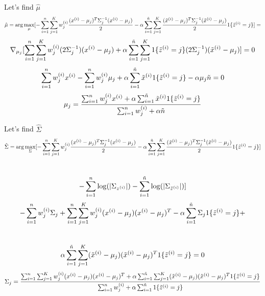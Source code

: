 \begin{answer}
Let's find $\hat{\mu}$
$$\hat{\mu} =  \arg\max_{\mu} [- \sum_{i=1}^{{n}} \sum_{j=1}^{K}  w_j^{(i)} \frac{(x^{(i)} - \mu_j)^T\Sigma_j^{-1}(x^{(i)} - \mu_j)}{2}  - \alpha \sum_{i=1}^{\tilde{{n}}} \sum_{j=1}^{K} \frac{(\tilde{x}^{(i)} - \mu_{j})^T\Sigma_{j}^{-1}(\tilde{x}^{(i)} - \mu_{j})}{2} 1\{\tilde{z}^{(i)}=j\}] = $$
$$\nabla_{\mu_j}[\sum_{i=1}^{{n}} \sum_{j=1}^{K} w_j^{(i)} (2\Sigma_j^{-1}) (x^{(i)} - \mu_j) +\alpha \sum_{i=1}^{\tilde{n}} \sum_{j=1}^{K}  1\{\tilde{z}^{(i)}=j\} (2\Sigma_j^{-1}) (\tilde{x}^{(i)} - \mu_j) ] = 0$$
$$\sum_{i=1}^{{n}} w_j^{(i)} x^{(i)} - \sum_{i=1}^{{n}}  w_j^{(i)} \mu_j +\alpha \sum_{i=1}^{\tilde{n}} \tilde{x}^{(i)} 1\{\tilde{z}^{(i)}=j\}-\alpha \mu_j \tilde{n} = 0$$
$$\mu_j = \frac{\sum_{i=1}^{{n}}  w_j^{(i)} x^{(i)} + \alpha \sum_{i=1}^{\tilde{n}} \tilde{x}^{(i)}1\{\tilde{z}^{(i)}=j\}}{\sum_{i=1}^{{n}} w_j^{(i)} + \alpha \tilde{n}}$$

Let's find $\hat{\Sigma}$
$$\hat{\Sigma} =  \arg\max_{\Sigma} [- \sum_{i=1}^{{n}} \sum_{j=1}^{K}  w_j^{(i)} \frac{(x^{(i)} - \mu_j)^T\Sigma_j^{-1}(x^{(i)} - \mu_j)}{2}  - \alpha \sum_{i=1}^{\tilde{{n}}} \sum_{j=1}^{K} \frac{(\tilde{x}^{(i)} - \mu_{j})^T\Sigma_{j}^{-1}(\tilde{x}^{(i)} - \mu_{j})}{2} 1\{\tilde{z}^{(i)}=j\}]$$ \\
$$ - \sum_{i=1}^{{n}} \log(|\Sigma_{z^{(i)}}|)  - \sum_{i=1}^{\tilde{{n}}} \log(|\Sigma_{\tilde{z}^{(i)}}|)]$$
$$-\sum_{i=1}^{{n}} w_j^{(i)} \Sigma_j + \sum_{i=1}^{{n}} \sum_{j=1}^{K}  w_j^{(i)} (x^{(i)} - \mu_j)(x^{(i)} - \mu_j)^T -  \alpha \sum_{i=1}^{\tilde{{n}}} \Sigma_j 1\{\tilde{z}^{(i)}= j\} +  $$ \\
$$\alpha \sum_{i=1}^{\tilde{{n}}} \sum_{j=1}^{K} (\tilde{x}^{(i)} - \mu_{j})(\tilde{x}^{(i)} - \mu_{j})^T 1\{\tilde{z}^{(i)}=j\}=0$$
$$\Sigma_j = \frac{ \sum_{i=1}^{{n}} \sum_{j=1}^{K}  w_j^{(i)} (x^{(i)} - \mu_j)(x^{(i)} - \mu_j)^T + \alpha \sum_{i=1}^{\tilde{{n}}} \sum_{j=1}^{K} (\tilde{x}^{(i)} - \mu_{j})(\tilde{x}^{(i)} - \mu_{j})^T 1\{\tilde{z}^{(i)}=j\}}{\sum_{i=1}^{{n}} w_j^{(i)} + \alpha \sum_{i=1}^{\tilde{{n}}} 1\{\tilde{z}^{(i)}= j\} }$$


\end{answer}
